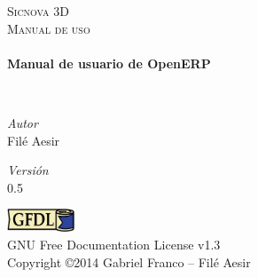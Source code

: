 \begin{titlepage}
\begin{center}


\vspace*{5cm}
\textsc{\LARGE Sicnova 3D}\\[1.5cm]

\textsc{\Large Manual de uso}\\[0.5cm]

\HRule \\[0.4cm]
{ \huge \bfseries Manual de usuario de OpenERP \\[0.4cm] }

\HRule \\[1.5cm]


\noindent
\vfill
\begin{minipage}{0.4\textwidth}
\begin{flushleft} \large
\emph{Autor}\\

Filé Aesir
\end{flushleft}
\end{minipage}%
\begin{minipage}{0.4\textwidth}
\begin{flushright} \large
\emph{Versión} \\
0.5
\end{flushright}
\end{minipage}
\vspace{2cm}



\includegraphics[width=2cm]{GFDL.png}\\
GNU Free Documentation License v1.3\\
Copyright \copyright 2014 Gabriel Franco -- Filé Aesir

\end{center}
\end{titlepage}
